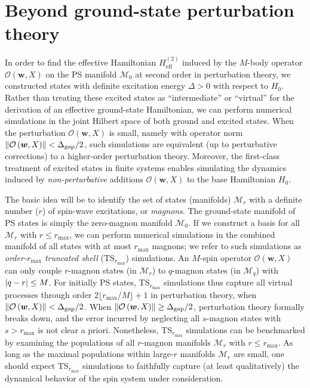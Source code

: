 \documentclass[nofootinbib,notitlepage,11pt]{revtex4-2}
\renewcommand{\t}{\text} %
\newcommand{\p}[1]{\left(#1\right)} %
\newcommand{\m}{\bm} %
\newcommand{\1}{\mathds{1}}
\newcommand{\M}{\mathcal{M}}
\renewcommand{\O}{\mathcal{O}}
\newcommand{\floor}[1]{\lfloor{#1}\rfloor}
\begin{document}
\section{Beyond ground-state perturbation theory}
\label{sec:shell_model}

In order to find the effective Hamiltonian $H_{\t{eff}}^{(2)}$ induced
by the $M$-body operator $\O\p{\m w,X}$ on the PS manifold $\M_0$ at
second order in perturbation theory, we constructed states with
definite excitation energy $\Delta>0$ with respect to $H_0$.  Rather
than treating these excited states as ``intermediate'' or ``virtual''
for the derivation of an effective ground-state Hamiltonian, we can
perform numerical simulations in the joint Hilbert space of both
ground and excited states.  When the perturbation $\O\p{\m w,X}$ is
small, namely with operator norm
$\norm{\O\p{\m w,X}}<\Delta_{\t{gap}}/2$, such simulations are
equivalent (up to perturbative corrections) to a higher-order
perturbation theory.  Moreover, the first-class treatment of excited
states in finite systems enables simulating the dynamics induced by
{\it non-perturbative} additions $\O\p{\m w,X}$ to the base
Hamiltonian $H_0$.

The basic idea will be to identify the set of states (manifolds)
$\M_r$ with a definite number ($r$) of spin-wave excitations, or {\it
  magnons}.  The ground-state manifold of PS states is simply the
zero-magnon manifold $\M_0$.  If we construct a basis for all $\M_r$
with $r\le r_{\t{max}}$, we can perform numerical simulations in the
combined manifold of all states with at most $r_{\t{max}}$ magnons; we
refer to such simulations as {\it order-}$r_{\t{max}}$ {\it truncated
  shell} (TS$_{r_{\t{max}}}$) simulations.  An $M$-spin operator
$\O\p{\m w,X}$ can only couple $r$-magnon states (in $\M_r$) to
$q$-magnon states (in $\M_q$) with $\abs{q-r}\le M$.  For initially PS
states, TS$_{r_{\t{max}}}$ simulations thus capture all virtual
processes through order $2\floor{r_{\t{max}}/M}+1$ in perturbation
theory, when $\norm{\O\p{\m w,X}}<\Delta_{\t{gap}}/2$.  When
$\norm{\O\p{\m w,X}}\ge\Delta_{\t{gap}}/2$, perturbation theory
formally breaks down, and the error incurred by neglecting all
$s$-magnon states with $s>r_{\t{max}}$ is not clear a priori.
Nonetheless, TS$_{r_{\t{max}}}$ simulations can be benchmarked by
examining the populations of all $r$-magnon manifolds $\M_r$ with
$r\le r_{\t{max}}$.  As long as the maximal populations within
large-$r$ manifolds $\M_r$ are small, one should expect
TS$_{r_{\t{max}}}$ simulations to faithfully capture (at least
qualitatively) the dynamical behavior of the spin system under
consideration.
\end{document}
